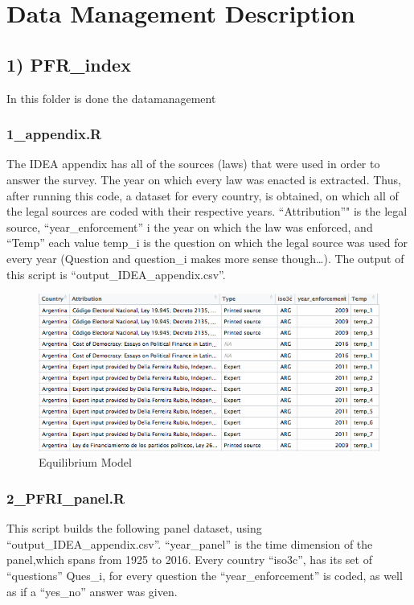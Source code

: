 \documentclass[12,twoside]{article}
\begin{document}
\section{Data Management Description}\label{datamanagement}

\subsection{1) PFR\_index}\label{pfr_index}

In this folder is done the datamanagement

\subsubsection{1\_appendix.R}\label{appendix.r}

The IDEA appendix has all of the sources (laws) that were used in order
to answer the survey. The year on which every law was enacted is
extracted. Thus, after running this code, a dataset for every country,
is obtained, on which all of the legal sources are coded with their
respective years. ``Attribution''" is the legal source,
``year\_enforcement'' i the year on which the law was enforced, and
``Temp'' each value temp\_i is the question on which the legal source
was used for every year (Question and question\_i makes more sense
though\ldots{}). The output of this script is
``output\_IDEA\_appendix.csv''.

\begin{figure}[htbp]
\centering
\includegraphics{image_1.png}
\caption{Equilibrium Model}
\end{figure}

\subsubsection{2\_PFRI\_panel.R}\label{pfri_panel.r}

This script builds the following panel dataset, using
``output\_IDEA\_appendix.csv''. ``year\_panel'' is the time dimension of
the panel,which spans from 1925 to 2016. Every country ``iso3c'', has
its set of ``questions'' Ques\_i, for every question the
``year\_enforcement'' is coded, as well as if a ``yes\_no'' answer was
given.
\end{document}
